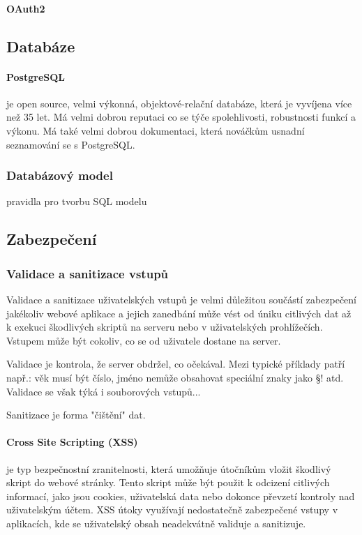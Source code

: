 \documentclass[12pt, a4paper]{article}
\begin{document}
\paragraph{OAuth2}
\subsection{Databáze}
\paragraph{PostgreSQL}
je open source, velmi výkonná, objektové-relační databáze, která je vyvíjena více než 35 let. Má velmi dobrou reputaci co se týče spolehlivosti, robustnosti funkcí a výkonu. Má také velmi dobrou dokumentaci, která nováčkům usnadní seznamování se s PostgreSQL.
\cite{postgresql_global_development_group_postgresql_2024}
\subsubsection{Databázový model}
pravidla pro tvorbu SQL modelu
\subsection{Zabezpečení}
\subsubsection{Validace a sanitizace vstupů}
Validace a sanitizace uživatelských vstupů je velmi důležitou součástí zabezpečení jakékoliv webové aplikace a jejich zanedbání může vést od úniku citlivých dat až k exekuci škodlivých skriptů na serveru nebo v uživatelských prohlížečích. Vstupem může být cokoliv, co se od uživatele dostane na server.

Validace je kontrola, že server obdržel, co očekával. Mezi typické příklady patří např.: věk musí být číslo, jméno nemůže obsahovat speciální znaky jako §! atd. Validace se však týká i souborových vstupů...

Sanitizace je forma "čištění" dat.
\paragraph{Cross Site Scripting (XSS)}
je typ bezpečnostní zranitelnosti, která umožňuje útočníkům vložit škodlivý skript do webové stránky. Tento skript může být použit k odcizení citlivých informací, jako jsou cookies, uživatelská data nebo dokonce převzetí kontroly nad uživatelským účtem. XSS útoky využívají nedostatečně zabezpečené vstupy v aplikacích, kde se uživatelský obsah neadekvátně validuje a sanitizuje.
\end{document}
